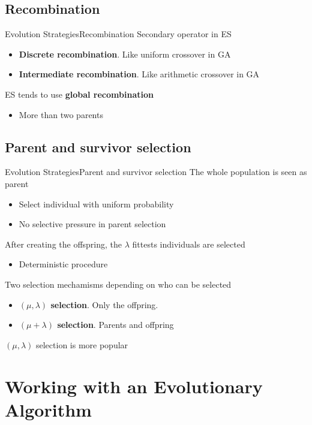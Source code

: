 \documentclass[10pt,compress]{beamer} %
\begin{document}
\subsection{Recombination}
\begin{frame}{Evolution Strategies}{Recombination}
	Secondary operator in ES
	\begin{itemize}
		\item \textbf{Discrete recombination}. Like uniform crossover in GA
		\item \textbf{Intermediate recombination}. Like arithmetic crossover in GA
	\end{itemize}
	ES tends to use \textbf{global recombination}
	\begin{itemize}
		\item More than two parents
	\end{itemize}
\end{frame}

\subsection{Parent and survivor selection}
\begin{frame}{Evolution Strategies}{Parent and survivor selection}
	The whole population is seen as parent
	\begin{itemize}
		\item Select individual with uniform probability
		\item No selective pressure in parent selection
	\end{itemize}
	After creating the offspring, the $\lambda$ fittests individuals are selected
	\begin{itemize}
		\item Deterministic procedure
	\end{itemize}
	Two selection mechamisms depending on who can be selected
	\begin{itemize}
		\item \textbf{$(\mu, \lambda)$ selection}. Only the offpring.  
		\item \textbf{$(\mu + \lambda)$ selection}. Parents and offpring
	\end{itemize}
	$(\mu, \lambda)$ selection is more popular
\end{frame}

\section{Working with an Evolutionary Algorithm}
\end{document}
